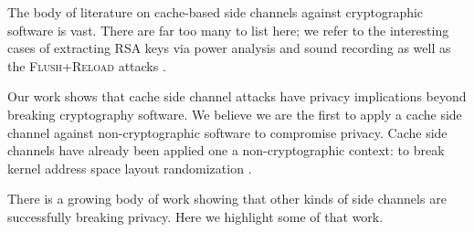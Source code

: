 \documentclass{acm_proc_article-sp}
\begin{document}
The body of literature on cache-based side channels against cryptographic
software is vast. There are far too many to list here; we refer to the
interesting cases of extracting RSA keys via power analysis
\cite{messerges1999power} and sound recording \cite{genkin2013rsa} as well as
the \textsc{Flush+Reload} attacks \cite{yarom2013flush, benger2014ooh,
yarom2014recovering}.

Our work shows that cache side channel attacks have privacy implications beyond
breaking cryptography software. We believe we are the first to apply a cache
side channel against non-cryptographic software to compromise privacy. Cache
side channels have already been applied one a non-cryptographic context: to
break kernel address space layout randomization \cite{hund2013practical}.

There is a growing body of work showing that other kinds of side channels are
successfully breaking privacy. Here we highlight some of that work.
\end{document}
